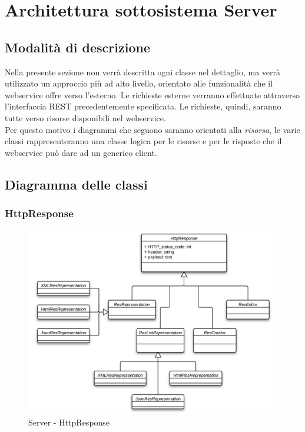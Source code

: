 {{\section{Architettura sottosistema Server}

\subsection{Modalità di descrizione}
Nella presente sezione non verrà descritta ogni classe nel dettaglio, ma verrà utilizzato un approccio più ad alto livello, orientato alle funzionalità che il webservice offre verso l'esterno.
Le richieste esterne verranno effettuate attraverso l'interfaccia REST precedentemente specificata. Le richieste, quindi, saranno tutte verso risorse disponibili nel webservice. \\
Per questo motivo i diagrammi che seguono saranno orientati alla \emph{risorsa}, le varie classi rappresenteranno una classe logica per le risorse e per le risposte che il webservice può dare ad un generico client.

\subsection{Diagramma delle classi}

\subsubsection{HttpResponse}

\begin{figure}[H]
\centering
\includegraphics[scale=0.55]{images/cap2/Server/HttpResponse.png}
\caption{Server - HttpResponse}
\end{figure}

}}
